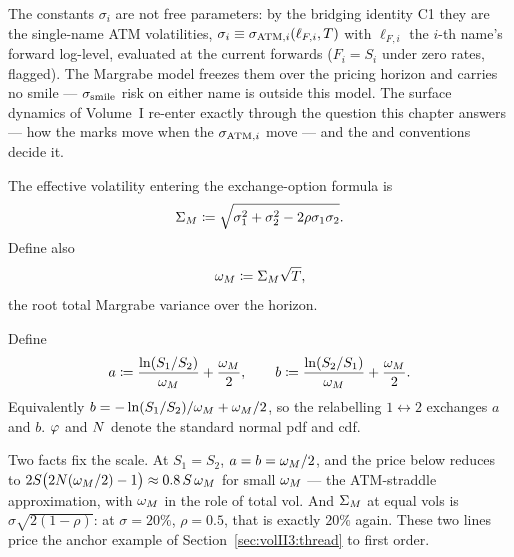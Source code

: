 \begin{remark}\label{rem:volII3:C1}
The constants $\sigma_i$ are not free parameters: by the bridging identity C1
they are the single-name ATM volatilities, $\sigma_i \equiv
\sigma_{\mathrm{ATM},i}(\ell_{F,i}, T)$ with $\ell_{F,i}$ the $i$-th name's forward
log-level, evaluated at the current forwards ($F_i = S_i$ under zero rates,
flagged). The Margrabe model freezes them over the pricing horizon and carries
no smile --- $\sigma_{\mathrm{smile}}$ risk on either name is outside this model. The surface
dynamics of Volume~I re-enter exactly through the question this chapter
answers --- how the marks move when the $\sigma_{\mathrm{ATM},i}$ move --- and the
\stickyrho{} and \stickycvc{} conventions decide it.
\end{remark}

\begin{definition}\label{def:volII3:SigmaM}
The effective volatility entering the exchange-option formula is
\begin{equation}\label{eq:volII3:SigmaM}
\Sigma_M \coloneqq \sqrt{\sigma_1^2 + \sigma_2^2 - 2\rho\sigma_1\sigma_2}.
\end{equation}
Define also
\begin{equation}\label{eq:volII3:omM}
\omega_M \coloneqq \Sigma_M \sqrt{T},
\end{equation}
the root total Margrabe variance over the horizon.
\end{definition}

\begin{definition}\label{def:volII3:ab}
Define
\begin{equation}\label{eq:volII3:ab}
a \coloneqq \frac{\ln(S_1/S_2)}{\omega_M} + \frac{\omega_M}{2}, \qquad
b \coloneqq \frac{\ln(S_2/S_1)}{\omega_M} + \frac{\omega_M}{2}.
\end{equation}
Equivalently $b = -\ln(S_1/S_2)/\omega_M + \omega_M/2$, so the relabelling
$1 \leftrightarrow 2$ exchanges $a$ and $b$. $\varphi$ and $N$ denote
the standard normal pdf and cdf.
\end{definition}

Two facts fix the scale. At $S_1 = S_2$, $a = b = \omega_M/2$, and
the price below reduces to $2S\bigl(2N(\omega_M/2) - 1\bigr) \approx
0.8\,S\,\omega_M$ for small $\omega_M$ --- the ATM-straddle approximation,
with $\omega_M$ in the role of total vol. And $\Sigma_M$ at equal vols is
$\sigma\sqrt{2(1-\rho)}$: at $\sigma = 20\%$, $\rho = 0.5$, that is exactly
$20\%$ again. These two lines price the anchor example of
Section~\ref{sec:volII3:thread} to first order.

